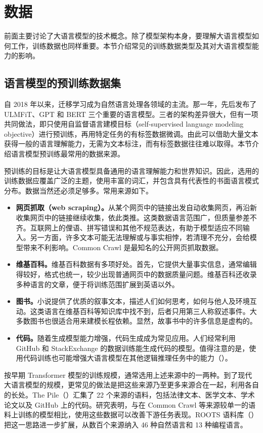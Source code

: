 \section{数据}
\label{sec:ch02-data}
前面主要讨论了大语言模型的技术概念。除了模型架构本身，要理解大语言模型如何工作，训练数据也同样重要。本节介绍常见的训练数据类型及其对大语言模型能力的影响。

\subsection{语言模型的预训练数据集}
自 2018 年以来，迁移学习成为自然语言处理各领域的主流。那一年，先后发布了 ULMFiT、GPT 和 BERT 三个重要的语言模型。三者的架构差异很大，但有一项共同做法，即只使用自监督语言建模目标（self-supervised language modeling objective）进行预训练，再用特定任务的有标签数据微调。由此可以借助大量文本获得一般的语言理解能力，无需为文本标注，而有标签数据往往难以取得。本节介绍语言模型预训练最常用的数据来源。

预训练的目标是让大语言模型具备通用的语言理解能力和世界知识。因此，选用的训练数据应覆盖广泛的主题，使用丰富的词汇，并包含具有代表性的书面语言模式分布。数据当然还必须足够多。常用来源如下。
\begin{itemize}
\item \textbf{网页抓取（web scraping）。}从某个网页中的链接出发自动收集网页，再沿新收集网页中的链接继续收集，依此类推。这类数据语言范围广，但质量参差不齐。互联网上的俚语、拼写错误和其他不规范表达，有助于模型适应不同输入。另一方面，许多文本可能无法理解或与事实相悖，若清理不充分，会给模型带来不利影响。Common Crawl 是最知名的公开网页抓取数据。
\item \textbf{维基百科。}维基百科数据有多项好处。首先，它提供大量事实信息，通常编辑得较好，格式也统一，较少出现普通网页中的数据质量问题。维基百科还收录多种语言的文章，便于将训练范围扩展到英语以外。
\item \textbf{图书。}小说提供了优质的叙事文本，描述人们如何思考，如何与他人及环境互动。这类语言在维基百科等知识库中找不到，后者只用第三人称叙述事件。大多数图书也很适合用来建模长程依赖。显然，故事书中的许多信息是虚构的。
\item \textbf{代码。}随着生成模型能力增强，代码生成成为常见应用。人们经常利用 GitHub 和 StackExchange 的数据训练能生成代码的模型。值得注意的是，使用代码训练也可能增强大语言模型在其他逻辑推理任务中的能力（）。
\end{itemize}

按早期 Transformer 模型的训练规模，通常选用上述来源中的一两种。到了现代大语言模型的规模，更常见的做法是把这些来源乃至更多来源合在一起，利用各自的长处。The Pile（）汇集了 22 个来源的语料，包括法律文本、医学文本、学术论文以及 GitHub 上的代码。研究表明，与在 Common Crawl 等来源较单一的语料上训练的模型相比，使用这些数据可以改善下游任务表现。ROOTS 语料库（）把这一思路进一步扩展，从数百个来源纳入 46 种自然语言和 13 种编程语言。

